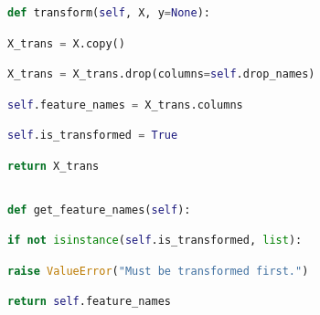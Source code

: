 \documentclass[
  11pt,
  a4paper,
  DIV=12,captions=tableheading,oneside]{scrbook}
\begin{document}
\begin{lstlisting}[language=Python,stepnumber=2,basicstyle=\footnotesize]
\end{lstlisting}
\begin{lstlisting}[language=Python,stepnumber=2,basicstyle=\footnotesize]
    def transform(self, X, y=None):\end{lstlisting}
\begin{lstlisting}[language=Python,stepnumber=2,basicstyle=\footnotesize]
        X_trans = X.copy()\end{lstlisting}
\begin{lstlisting}[language=Python,stepnumber=2,basicstyle=\footnotesize]
        X_trans = X_trans.drop(columns=self.drop_names)\end{lstlisting}
\begin{lstlisting}[language=Python,stepnumber=2,basicstyle=\footnotesize]
        self.feature_names = X_trans.columns\end{lstlisting}
\begin{lstlisting}[language=Python,stepnumber=2,basicstyle=\footnotesize]
        self.is_transformed = True\end{lstlisting}
\begin{lstlisting}[language=Python,stepnumber=2,basicstyle=\footnotesize]
        return X_trans\end{lstlisting}
\begin{lstlisting}[language=Python,stepnumber=2,basicstyle=\footnotesize]
\end{lstlisting}
\begin{lstlisting}[language=Python,stepnumber=2,basicstyle=\footnotesize]
    def get_feature_names(self):\end{lstlisting}
\begin{lstlisting}[language=Python,stepnumber=2,basicstyle=\footnotesize]
        if not isinstance(self.is_transformed, list):\end{lstlisting}
\begin{lstlisting}[language=Python,stepnumber=2,basicstyle=\footnotesize]
            raise ValueError("Must be transformed first.")\end{lstlisting}
\begin{lstlisting}[language=Python,stepnumber=2,basicstyle=\footnotesize]
        return self.feature_names\end{lstlisting}
\begin{lstlisting}[language=Python,stepnumber=2,basicstyle=\footnotesize]
\end{lstlisting}
\end{document}
